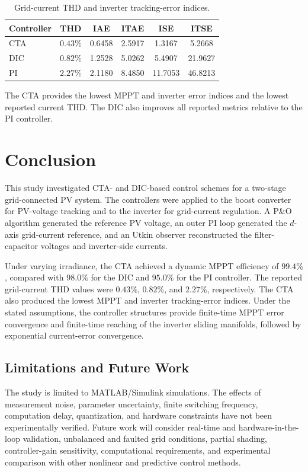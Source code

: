\documentclass[preprint,12pt]{elsarticle}
\begin{document}
\begin{table}[htbp]
\centering
\caption{Grid-current THD and inverter tracking-error indices.}
\label{tab:inverter-indices}
\begin{tabular}{lccccc}
\toprule
Controller & THD & IAE & ITAE & ISE & ITSE\\
\midrule
CTA & $0.43\%$ & 0.6458 & 2.5917 & 1.3167 & 5.2668\\
DIC & $0.82\%$ & 1.2528 & 5.0262 & 5.4907 & 21.9627\\
PI & $2.27\%$ & 2.1180 & 8.4850 & 11.7053 & 46.8213\\
\bottomrule
\end{tabular}
\end{table}

The CTA provides the lowest MPPT and inverter error indices and the lowest reported current THD. The DIC also improves all reported metrics relative to the PI controller.

\section{Conclusion}
\label{sec:conclusion}

This study investigated CTA- and DIC-based control schemes for a two-stage grid-connected PV system. The controllers were applied to the boost converter for PV-voltage tracking and to the inverter for grid-current regulation. A P\&O algorithm generated the reference PV voltage, an outer PI loop generated the $d$-axis grid-current reference, and an Utkin observer reconstructed the filter-capacitor voltages and inverter-side currents.

Under varying irradiance, the CTA achieved a dynamic MPPT efficiency of $99.4\%$, compared with $98.0\%$ for the DIC and $95.0\%$ for the PI controller. The reported grid-current THD values were $0.43\%$, $0.82\%$, and $2.27\%$, respectively. The CTA also produced the lowest MPPT and inverter tracking-error indices. Under the stated assumptions, the controller structures provide finite-time MPPT error convergence and finite-time reaching of the inverter sliding manifolds, followed by exponential current-error convergence.

\subsection*{Limitations and Future Work}

The study is limited to MATLAB/Simulink simulations. The effects of measurement noise, parameter uncertainty, finite switching frequency, computation delay, quantization, and hardware constraints have not been experimentally verified. Future work will consider real-time and hardware-in-the-loop validation, unbalanced and faulted grid conditions, partial shading, controller-gain sensitivity, computational requirements, and experimental comparison with other nonlinear and predictive control methods.



\end{document}
